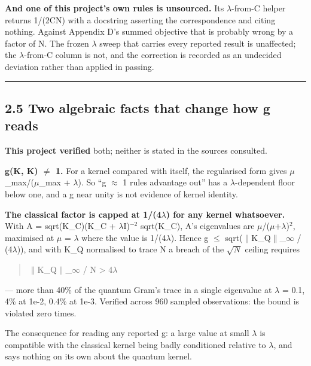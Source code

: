 \documentclass[
  10pt,
]{article}
\begin{document}
\textbf{And one of this project's own rules is unsourced.} Its
\(\lambda\)-from-C helper returns 1/(2CN) with a docstring asserting the
correspondence and citing nothing. Against Appendix D's summed objective
that is probably wrong by a factor of N. The frozen \(\lambda\) sweep
that carries every reported result is unaffected; the \(\lambda\)-from-C
column is not, and the correction is recorded as an undecided deviation
rather than applied in passing.

\begin{center}\rule{0.5\linewidth}{0.5pt}\end{center}

\subsection{2.5 Two algebraic facts that change how g
reads}\label{two-algebraic-facts-that-change-how-g-reads}

\textbf{This project verified} both; neither is stated in the sources
consulted.

\textbf{g(K, K) \(\ne\) 1.} For a kernel compared with itself, the
regularised form gives \(\mu\)\_max/(\(\mu\)\_max + \(\lambda\)). So ``g
\(\approx\) 1 rules advantage out'' has a \(\lambda\)-dependent floor
below one, and a g near unity is not evidence of kernel identity.

\textbf{The classical factor is capped at 1/(4\(\lambda\)) for any
kernel whatsoever.} With A = sqrt(K\_C)(K\_C + \(\lambda\)I)\(^{-2}\)
sqrt(K\_C), A's eigenvalues are \(\mu\)/(\(\mu\)+\(\lambda\))\(^{2}\),
maximised at \(\mu\) = \(\lambda\) where the value is 1/(4\(\lambda\)).
Hence g \(\le\) sqrt(\(\|\)K\_Q\(\|\)\_\(\infty\) / (4\(\lambda\))), and
with K\_Q normalised to trace N a breach of the \(\sqrt{N}\) ceiling
requires

\begin{quote}
\(\|\)K\_Q\(\|\)\_\(\infty\) / N \textgreater{} 4\(\lambda\)
\end{quote}

--- more than 40\% of the quantum Gram's trace in a single eigenvalue at
\(\lambda\) = 0.1, 4\% at 1e-2, 0.4\% at 1e-3. Verified across 960
sampled observations: the bound is violated zero times.

The consequence for reading any reported g: a large value at small
\(\lambda\) is compatible with the classical kernel being badly
conditioned relative to \(\lambda\), and says nothing on its own about
the quantum kernel.
\end{document}

